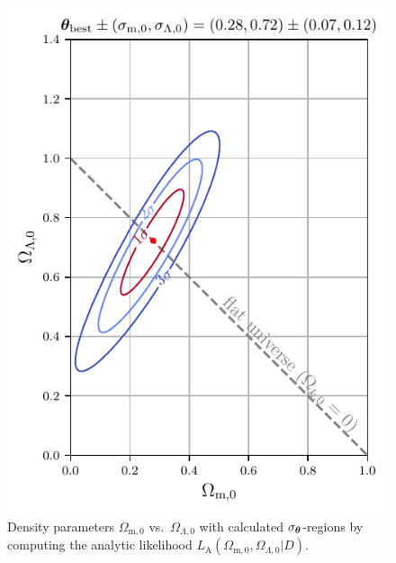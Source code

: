 \begin{figure}[H]
    \begin{minipage}{8cm}
       \centering
       \includegraphics[scale=1.0]{figures/plots/PDF/Lambda-CDM-analytic-likelihood_Omega-m0-vs-Omega-Lambda0.pdf}
       \caption{Density parameters $\Omega_{\text{m},0}$ vs.\ $\Omega_{\Lambda,0}$ with calculated $\sigma_{\vb*{\theta}}$-regions by computing the analytic likelihood $L_{\text{A}}(\Omega_{\text{m},0}, 
       \Omega_{\Lambda,0} \vert D)$.}
       \label{fig:Lambda-CDM-analytic-likelihood_Omega-m0-vs-Omega-Lambda0}
    \end{minipage}
    \hspace*{1cm}
    \begin{minipage}{8cm}
       \centering

\end{minipage}
\end{figure}
